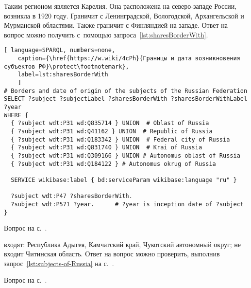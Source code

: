 \begin{task}
\label{answer:subjects_of_Russia_1}
Таким регионом является Карелия. 
    Она расположена на северо-западе России, возникла в 1920 году. 
    Граничит с Ленинградской, Вологодской, Архангельской и Мурманской областями. 
    Также граничит с Финляндией на западе.  
    Ответ на вопрос можно получить с~помощью запроса~\ref{lst:sharesBorderWith}.


\newpage
\begin{lstlisting}[ language=SPARQL, numbers=none,
	caption={\href{https://w.wiki/4cPh}{Границы и дата возникновения субъектов РФ}\protect\footnotemark},
	label=lst:sharesBorderWith
	]
# Borders and date of origin of the subjects of the Russian Federation
SELECT ?subject ?subjectLabel ?sharesBorderWith ?sharesBorderWithLabel ?year 
WHERE {
  { ?subject wdt:P31 wd:Q835714 } UNION  # Oblast of Russia
  { ?subject wdt:P31 wd:Q41162 } UNION  # Republic of Russia
  { ?subject wdt:P31 wd:Q183342 } UNION  # Federal city of Russia
  { ?subject wdt:P31 wd:Q831740 } UNION  # Krai of Russia
  { ?subject wdt:P31 wd:Q309166 } UNION # Autonomus oblast of Russia
  { ?subject wdt:P31 wd:Q184122 } # Autonomus okrug of Russia
  
  SERVICE wikibase:label { bd:serviceParam wikibase:language "ru" }
  
  ?subject wdt:P47 ?sharesBorderWith. 
  ?subject wdt:P571 ?year.      # ?year is inception date of ?subject
}
\end{lstlisting}
	
\small{\AnswerBackref Вопрос на с.~\pageref{lst:sharesBorderWith-oblast-of-Russia}.}
\end{task}



\begin{task}
	\label{answer:subjects_of_Russia_2}
     входят: Республика Адыгея, 
    Камчатский край, Чукотский автономный округ; не входит Читинская область. 
    Ответ на вопрос можно проверить, 
    выполнив запрос~\ref{lst:subjects-of-Russia} на с.~\pageref{lst:subjects-of-Russia}.

\small{\AnswerBackref Вопрос на с.~\pageref{lst:sharesBorderWith-empty-oblast-of-Russia}.}
\end{task}



\hfil{}\hfil%
\newpage

